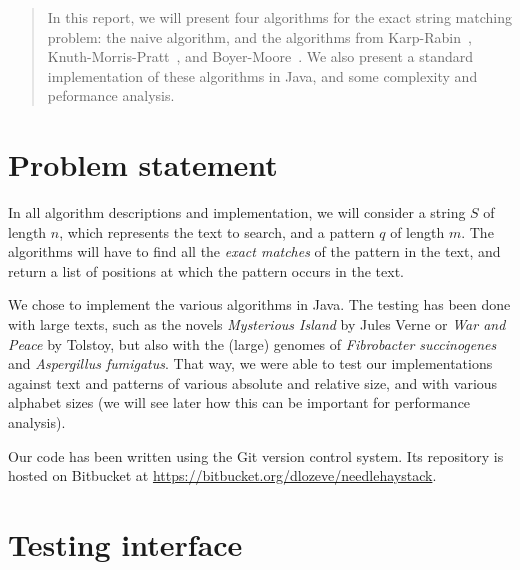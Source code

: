 \documentclass[a4paper,11pt,openany,extrafontsizes,twoside,article]{memoir}
\begin{document}
\pagestyle{Ruled}
\tightlists{}

\maketitle


\begin{abstract}
  In this report, we will present four algorithms for the exact string
  matching problem: the naive algorithm, and the algorithms from
  Karp-Rabin~\cite{karp1987efficient},
  Knuth-Morris-Pratt~\cite{knuth1977fast}, and
  Boyer-Moore~\cite{boyer1977fast}. We also present a standard
  implementation of these algorithms in Java, and some complexity and
  peformance analysis.
\end{abstract}

\tableofcontents*

\chapter{Problem statement}
\label{cha:problem-statement}

In all algorithm descriptions and implementation, we will consider a
string $S$ of length $n$, which represents the text to search, and a
pattern $q$ of length $m$. The algorithms will have to find all the
\emph{exact matches} of the pattern in the text, and return a list of
positions at which the pattern occurs in the text.

We chose to implement the various algorithms in Java. The testing has
been done with large texts, such as the novels \emph{Mysterious
  Island} by Jules Verne or \emph{War and Peace} by Tolstoy, but also
with the (large) genomes of \emph{Fibrobacter succinogenes} and
\emph{Aspergillus fumigatus}. That way, we were able to test our
implementations against text and patterns of various absolute and
relative size, and with various alphabet sizes (we will see later how
this can be important for performance analysis).

Our code has been written using the Git version control system. Its
repository is hosted on Bitbucket at
\url{https://bitbucket.org/dlozeve/needlehaystack}.

\chapter{Testing interface}
\label{cha:testing-interface}
\end{document}
